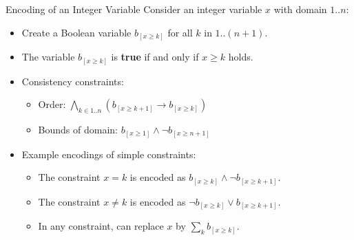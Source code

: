 \documentclass{cons-beamer}
\begin{document}
\begin{frame}{ Encoding of an Integer Variable}
  Consider an integer variable $x$ with domain $1..n$: \vfill
  \begin{itemize}
    \item Create a Boolean variable $b_{[x \geq k]}$ for all $k$ in
      $1..(n+1)$. \vfill
    \item The variable $b_{[x \geq k]}$ is \textbf{true} if and only if
      $x \geq k$ holds. \vfill
    \item Consistency constraints: \vfill
      \begin{itemize}
        \item Order:
          $\displaystyle\bigwedge_{k \in 1..n} \left(b_{[x \geq k+1]} \rightarrow b_{[x \geq k]} \right)$ \vfill
        \item Bounds of domain: $b_{[x \geq 1]} \land \lnot b_{[x \geq n+1]}$
      \end{itemize} \vfill
    \item Example encodings of simple constraints:
      \begin{itemize}
        \item The constraint $x = k$ is encoded as
          $b_{[x \geq k]} \land \lnot b_{[x \geq k+1]}$. \vfill
        \item The constraint $x \neq k$ is encoded as
          $\lnot b_{[x \geq k]} \lor b_{[x \geq k+1]}$. \vfill
        \item In any constraint, can replace $x$ by $\sum_k b_{[x \geq k]}$.
      \end{itemize}
  \end{itemize}
\end{frame}
\end{document}
